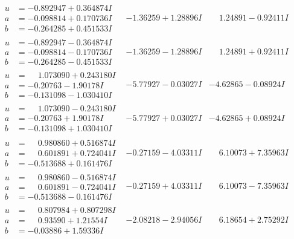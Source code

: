 \documentclass[1p]{elsarticle_modified}
\theoremstyle{definition}
\begin{document}
$$\begin{array}{c|c|c}
\begin{aligned}
u &= -0.892947 + 0.364874 I \\
a &= -0.098814 + 0.170736 I \\
b &= -0.264285 + 0.451533 I\end{aligned}
 & -1.36259 + 1.28896 I & \phantom{-}1.24891 - 0.92411 I \\ \hline\begin{aligned}
u &= -0.892947 - 0.364874 I \\
a &= -0.098814 - 0.170736 I \\
b &= -0.264285 - 0.451533 I\end{aligned}
 & -1.36259 - 1.28896 I & \phantom{-}1.24891 + 0.92411 I \\ \hline\begin{aligned}
u &= \phantom{-}1.073090 + 0.243180 I \\
a &= -0.20763 - 1.90178 I \\
b &= -0.131098 - 1.030410 I\end{aligned}
 & -5.77927 - 0.03027 I & -4.62865 - 0.08924 I \\ \hline\begin{aligned}
u &= \phantom{-}1.073090 - 0.243180 I \\
a &= -0.20763 + 1.90178 I \\
b &= -0.131098 + 1.030410 I\end{aligned}
 & -5.77927 + 0.03027 I & -4.62865 + 0.08924 I \\ \hline\begin{aligned}
u &= \phantom{-}0.980860 + 0.516874 I \\
a &= \phantom{-}0.601891 + 0.724041 I \\
b &= -0.513688 + 0.161476 I\end{aligned}
 & -0.27159 - 4.03311 I & \phantom{-}6.10073 + 7.35963 I \\ \hline\begin{aligned}
u &= \phantom{-}0.980860 - 0.516874 I \\
a &= \phantom{-}0.601891 - 0.724041 I \\
b &= -0.513688 - 0.161476 I\end{aligned}
 & -0.27159 + 4.03311 I & \phantom{-}6.10073 - 7.35963 I \\ \hline\begin{aligned}
u &= \phantom{-}0.807984 + 0.807298 I \\
a &= \phantom{-}0.93590 + 1.21554 I \\
b &= -0.03886 + 1.59336 I\end{aligned}
 & -2.08218 - 2.94056 I & \phantom{-}6.18654 + 2.75292 I \\ \hline\begin{aligned}

\end{aligned}
\end{array}$$
\end{document}
